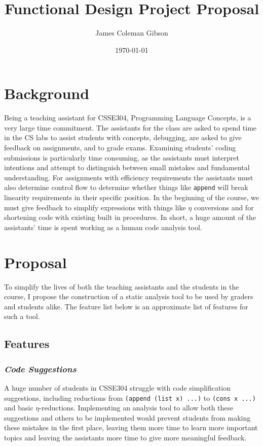 \documentclass{article}
\title{Functional Design Project Proposal}
\author{James Coleman Gibson}
\date{\today}
\begin{document}
\maketitle

\section*{Background}
Being a teaching assistant for CSSE304, Programming Language Concepts, is a very
large time commitment. The assistants for the class are asked to spend time in
the CS labs to assist students with concepts, debugging, are asked to give
feedback on assignments, and to grade exams. Examining students' coding
submissions is particularly time consuming, as the assistants must interpret
intentions and attempt to distinguish between small mistakes and fundamental
understanding. For assignments with efficiency requirements the assistants must
also determine control flow to determine whether things like \texttt{append}
will break linearity requirements in their specific position. In the beginning
of the course, we must give feedback to simplify expressions with things like
$\eta$ conversions and for shortening code with existing built in procedures. In
short, a huge amount of the assistants' time is spent working as a human code
analysis tool.

\section*{Proposal}
To simplify the lives of both the teaching assistants and the students in the
course, I propose the construction of a static analysis tool to be used by
graders and students alike. The feature list below is an approximate list of
features for such a tool.

\subsection*{Features}

\subsubsection*{\textit{Code Suggestions}}
A huge number of students in CSSE304 struggle with code simplification
suggestions, including reductions from \texttt{(append (list x) ...)} to
\texttt{(cons x ...)} and basic $\eta$-reductions. Implementing an
analysis tool to allow both these suggestions and others to be implemented would
prevent students from making these mistakes in the first place, leaving them
more time to learn more important topics and leaving the assistants more time to
give more meaningful feedback.
\end{document}
